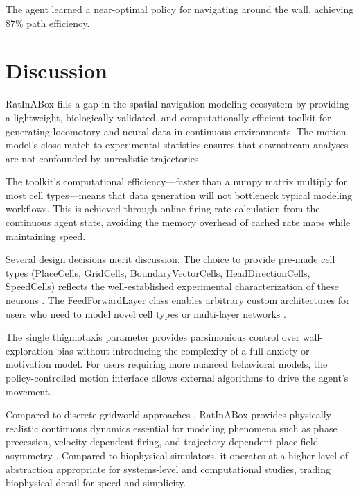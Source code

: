 \documentclass[11pt]{article}
\begin{document}
The agent learned a near-optimal policy for navigating around the wall, achieving 87\% path efficiency.

\section{Discussion}

RatInABox fills a gap in the spatial navigation modeling ecosystem by providing a lightweight, biologically validated, and computationally efficient toolkit for generating locomotory and neural data in continuous environments. The motion model's close match to experimental statistics \citep{sargolini2006conjunctive, satoh2006ethogram} ensures that downstream analyses are not confounded by unrealistic trajectories.

The toolkit's computational efficiency---faster than a numpy matrix multiply for most cell types---means that data generation will not bottleneck typical modeling workflows. This is achieved through online firing-rate calculation from the continuous agent state, avoiding the memory overhead of cached rate maps while maintaining speed.

Several design decisions merit discussion. The choice to provide pre-made cell types (PlaceCells, GridCells, BoundaryVectorCells, HeadDirectionCells, SpeedCells) reflects the well-established experimental characterization of these neurons \citep{okeefe1971hippocampus, hafting2005microstructure, lever2009boundary, taube1990head, kropff2015speed}. The FeedForwardLayer class enables arbitrary custom architectures for users who need to model novel cell types or multi-layer networks \citep{banino2018vector, whittington2020tolman}.

The single thigmotaxis parameter provides parsimonious control over wall-exploration bias without introducing the complexity of a full anxiety or motivation model. For users requiring more nuanced behavioral models, the policy-controlled motion interface allows external algorithms to drive the agent's movement.

Compared to discrete gridworld approaches \citep{stachenfeld2017hippocampus}, RatInABox provides physically realistic continuous dynamics essential for modeling phenomena such as phase precession, velocity-dependent firing, and trajectory-dependent place field asymmetry \citep{mehta2000experience, geisler2007hippocampal}. Compared to biophysical simulators, it operates at a higher level of abstraction appropriate for systems-level and computational studies, trading biophysical detail for speed and simplicity.
\end{document}
